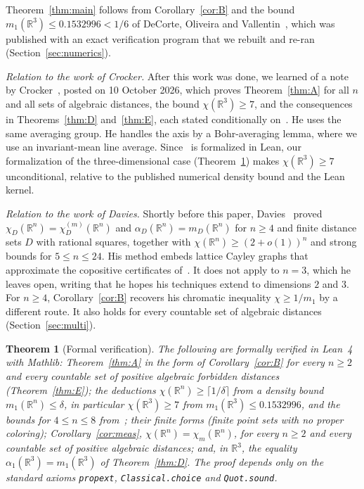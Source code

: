 \documentclass[11pt]{amsart}
\newtheorem{theorem}{Theorem}[section]
\theoremstyle{definition}
\newcommand{\R}{\mathbb{R}}
\begin{document}
Theorem~\ref{thm:main} follows from Corollary~\ref{cor:B} and the bound $m_1(\R^3)\le0.1532996<1/6$ of DeCorte, Oliveira and Vallentin~\cite[Table 2]{DOV}, which was published with an exact verification program that we rebuilt and re-ran (Section~\ref{sec:numerics}).

\emph{Relation to the work of Crocker.} After this work was done, we learned of a note by Crocker~\cite{Crocker}, posted on 10 October 2026, which proves Theorem~\ref{thm:A} for all $n$ and all sets of algebraic distances, the bound $\chi(\R^3)\ge7$, and the consequences in Theorems~\ref{thm:D} and~\ref{thm:E}, each stated conditionally on~\cite[Theorem 2.3]{OAI}. He uses the same averaging group. He handles the axis by a Bohr-averaging lemma, where we use an invariant-mean line average. Since~\cite[Theorem 2.3]{OAI} is formalized in Lean, our formalization of the three-dimensional case (Theorem~\ref{thm:lean}) makes $\chi(\R^3)\ge7$ unconditional, relative to the published numerical density bound and the Lean kernel.

\emph{Relation to the work of Davies.} Shortly before this paper, Davies~\cite{Davies} proved $\chi_D(\R^n)=\chi_D^{(m)}(\R^n)$ and $\alpha_D(\R^n)=m_D(\R^n)$ for $n\ge4$ and finite distance sets $D$ with rational squares, together with $\chi(\R^n)\ge(2+o(1))^n$ and strong bounds for $5\le n\le24$. His method embeds lattice Cayley graphs that approximate the copositive certificates of~\cite{DOV}. It does not apply to $n=3$, which he leaves open, writing that he hopes his techniques extend to dimensions $2$ and $3$. For $n\ge4$, Corollary~\ref{cor:B} recovers his chromatic inequality $\chi\ge1/m_1$ by a different route. It also holds for every countable set of algebraic distances (Section~\ref{sec:multi}).

\begin{theorem}[Formal verification]\label{thm:lean}
The following are formally verified in Lean~4 with Mathlib: Theorem~\ref{thm:A} in the form of Corollary~\ref{cor:B} for every $n\ge2$ and every countable set of positive algebraic forbidden distances (Theorem~\ref{thm:E}); the deductions $\chi(\R^n)\ge\lceil1/\delta\rceil$ from a density bound $m_1(\R^n)\le\delta$, in particular $\chi(\R^3)\ge7$ from $m_1(\R^3)\le0.1532996$, and the bounds for $4\le n\le8$ from~\cite[Table 2]{DOV}; their finite forms (finite point sets with no proper coloring); Corollary~\ref{cor:meas}, $\chi(\R^n)=\chi_m(\R^n)$, for every $n\ge2$ and every countable set of positive algebraic distances; and, in $\R^3$, the equality $\alpha_1(\R^3)=m_1(\R^3)$ of Theorem~\ref{thm:D}. The proof depends only on the standard axioms \texttt{propext}, \texttt{Classical.choice} and \texttt{Quot.sound}.
\end{theorem}
\end{document}
